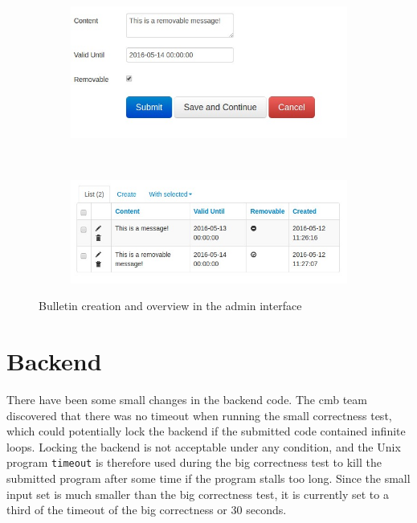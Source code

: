 \begin{figure}
    \centering
    \begin{subfigure}[b]{0.48\textwidth}
        \includegraphics[width=\textwidth]{figs/bulletin_creation.jpg}
    \end{subfigure}
    ~ %
    \begin{subfigure}[b]{0.48\textwidth}
        \includegraphics[width=\textwidth]{figs/bulletin_list.jpg}
    \end{subfigure}
    \caption{Bulletin creation and overview in the admin interface}
    \label{fig:admin-bulletin}
\end{figure}

\section{Backend}
\label{sec:impr-backend}
There have been some small changes in the backend code. The \gls{cmb} team discovered that there was no timeout when running the small correctness test, which could potentially lock the backend if the submitted code contained infinite loops. Locking the backend is not acceptable under any condition, and the Unix program \texttt{timeout} \cite{TIMEOUT} is therefore used during the big correctness test to kill the submitted program after some time if the program stalls too long. Since the small input set is much smaller than the big correctness test, it is currently set to a third of the timeout of the big correctness or 30 seconds. \\

